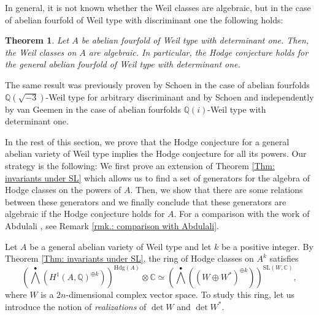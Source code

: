\documentclass[11pt,twoside,a4paper]{amsart}
\newcommand{\0}{\mathscr{O}}
\newcommand{\Q}{\mathbb{Q}}
\newcommand{\C}{\mathbb{C}}
\theoremstyle{plain}
\newtheorem{thm}{Theorem}[section]
\theoremstyle{definition}
\theoremstyle{remark}
\begin{document}
In general, it is not known whether the Weil classes are algebraic, but in the case of abelian fourfold of Weil type with discriminant one the following holds:
\begin{thm}\cite[Thm.\ 1.5]{markman2018monodromy}
\label{Thm.: Markman}
Let $A$ be abelian fourfold of Weil type with determinant one. Then, the Weil classes on $A$ are algebraic. In particular, the Hodge conjecture holds for the general abelian fourfold of Weil type with determinant one.
\end{thm}
The same result was previously proven by Schoen \cite{schoen1988hodge} in the case of abelian fourfolds $\Q(\sqrt{-3})$-Weil type for arbitrary discriminant and by Schoen \cite{schoen1988hodge} and independently by van Geemen \cite{van1996theta} in the case of abelian fourfolds $\Q(i)$-Weil type with determinant one.

\smallskip

In the rest of this section, we prove that the Hodge conjecture for a general abelian variety of Weil type implies the Hodge conjecture for all its powers.
Our strategy is the following: We first prove an extension of Theorem \ref{Thm: invariants under SL} which allows us to find a set of generators for the algebra of Hodge classes on the powers of $A$. Then, we show that there are some relations between these generators and we finally conclude that these generators are algebraic if the Hodge conjecture holds for $A$. For a comparison with the work of Abdulali \cite{abdulali1999abelianIII}, see Remark \ref{rmk.: comparison with Abdulali}.

\smallskip

Let $A$ be a general abelian variety of Weil type and let $k$ be a positive integer. By Theorem \ref{Thm: invariants under SL}, the ring of Hodge classes on $A^k$ satisfies
\[
\textstyle\left(\bigwedge^{\bullet}(H^1(A,\Q)^{\oplus k})\right)^{\mathrm{Hdg}(A)}\otimes\C\simeq \left(\bigwedge^{\bullet}((W\oplus W^*)^{\oplus k})\right)^{\mathrm{SL}(W,\C)},
\]
where $W$ is a $2n$-dimensional complex vector space. To study this ring, let us introduce the notion of \textit{realizations} of $\det W$ and $\det W^*$.
\end{document}
